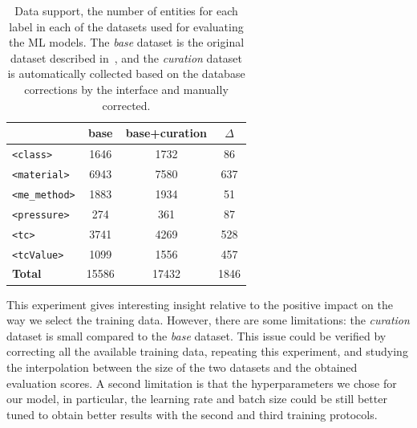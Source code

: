 \begin{table}[ht]
\centering
\small
\caption{Data support, the number of entities for each label in each of the datasets used for evaluating the ML models. The \emph{base} dataset is the original dataset described in~\cite{foppiano2021supermat}, and the \emph{curation} dataset is automatically collected based on the database corrections by the interface and manually corrected.}
\begin{tabular}{lccc}
\toprule
                        & \textbf{base}     & \textbf{base+curation}    & \textbf{$\Delta$}  \\ 
\midrule
\texttt{<class>}        & 1646              & 1732                      &  86                \\
\texttt{<material>}     & 6943              & 7580                      &  637               \\
\texttt{<me\_method>}   & 1883              & 1934                      &  51                \\
\texttt{<pressure>}     & 274               & 361                       &  87                \\
\texttt{<tc>}           & 3741              & 4269                      &  528               \\
\texttt{<tcValue>}      & 1099              & 1556                      &  457               \\
\midrule
\textbf{Total}          & 15586             & 17432                     & 1846               \\ 
\bottomrule
\end{tabular}
\label{tab:training-support}
\end{table}


This experiment gives interesting insight relative to the positive impact on the way we select the training data. 
However, there are some limitations: the \emph{curation} dataset is small compared to the \emph{base} dataset. This issue could be verified by correcting all the available training data, repeating this experiment, and studying the interpolation between the size of the two datasets and the obtained evaluation scores. 
A second limitation is that the hyperparameters we chose for our model, in particular, the learning rate and batch size could be still better tuned to obtain better results with the second and third training protocols.


